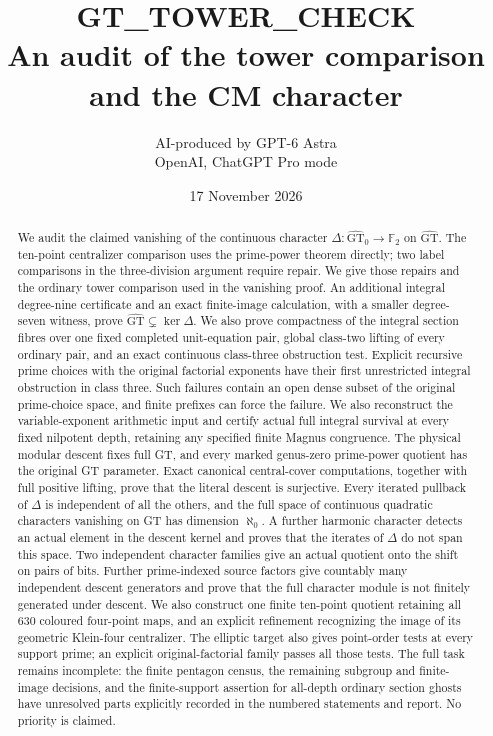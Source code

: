 \documentclass[11pt,a4paper]{article}
\title{GT\_TOWER\_CHECK\\An audit of the tower comparison and the CM character}
\author{AI-produced by GPT-6 Astra\\OpenAI, ChatGPT Pro mode}
\date{17 November 2026}
\newcommand{\GT}{\widehat{\mathrm{GT}}}
\newcommand{\GTz}{\widehat{\mathrm{GT}}_0}
\newcommand{\F}{\mathbb F}
\begin{document}
\maketitle
\begin{abstract}
We audit the claimed vanishing of the continuous character
$\Delta:\GTz\to\F_2$ on $\GT$. The ten-point centralizer
comparison uses the prime-power theorem directly; two
label comparisons in the three-division argument require
repair. We give those repairs and the ordinary tower
comparison used in the vanishing proof. An additional
integral degree-nine certificate and an exact finite-image
calculation, with a smaller degree-seven witness, prove $\GT\subsetneq\ker\Delta$.
We also prove compactness of the integral section fibres
over one fixed completed unit-equation pair, global class-two
lifting of every ordinary pair, and an exact continuous
class-three obstruction test. Explicit recursive prime
choices with the original factorial exponents have their
first unrestricted integral obstruction in class three.
Such failures contain an open dense subset of the original
prime-choice space, and finite prefixes can force the failure.
We also reconstruct the variable-exponent arithmetic input
and certify actual full integral survival at every fixed
nilpotent depth, retaining any specified finite Magnus congruence.
The physical modular descent fixes full GT, and every
marked genus-zero prime-power quotient has the original
GT parameter. Exact canonical central-cover computations,
together with full positive lifting, prove that the literal
descent is surjective. Every iterated pullback of $\Delta$
is independent of all the others, and the full space of
continuous quadratic characters vanishing on GT has dimension
$\aleph_0$. A further harmonic character detects an actual
element in the descent kernel and proves that the iterates
of $\Delta$ do not span this space. Two independent
character families give an actual quotient onto the shift
on pairs of bits. Further prime-indexed source factors
give countably many independent descent generators and
prove that the full character module is not finitely
generated under descent. We also construct one finite ten-point
quotient retaining all 630 coloured four-point maps, and
an explicit refinement recognizing the image of its
geometric Klein-four centralizer. The elliptic
target also gives point-order tests at every support prime;
an explicit original-factorial family passes all those tests.
The full
task remains incomplete: the finite pentagon census,
the remaining subgroup and finite-image decisions, and
the finite-support assertion for all-depth ordinary
section ghosts have unresolved parts explicitly recorded
in the numbered statements and report. No priority is claimed.
\end{abstract}
\tableofcontents
\end{document}
